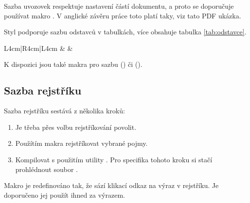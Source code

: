 \documentclass[
  biblatex,
  glossaries,
  index
]{kidiplom}
\begin{document}
Sazba uvozovek respektuje nastavení částí dokumentu, a proto se doporučuje používat makro . V anglické závěru práce toto platí taky, viz tato PDF ukázka.

Styl podporuje sazbu odstavců v tabulkách, více obsahuje tabulka \ref{tab:odstavce}.

\begin{table}
  \begin{center}
    \caption{Seznam přepínačů}\label{tab:odstavce}
    \begin{tabular}{L{4cm}|R{4cm}|L{4cm}}
      \lipsum[23] & \lipsum[22] & \lipsum[21]
    \end{tabular}
  \end{center}
\end{table}

K dispozici jsou také makra pro sazbu \csharp{} () či \cpp{} ().


\subsection{Sazba rejstříku}
Sazba rejstříku sestává z několika kroků:

\begin{enumerate}
  \item Je třeba přes volbu  rejstříkování povolit.
  \item Použítím makra  rejstříkovat vybrané pojmy.
  \item Kompilovat s použitím utility . Pro specifika tohoto kroku si stačí prohlédnout soubor .
\end{enumerate}

Makro  je redefinováno tak, že sází klikací odkaz na výraz v rejstříku. Je doporučeno jej použít ihned za výrazem.
\end{document}
